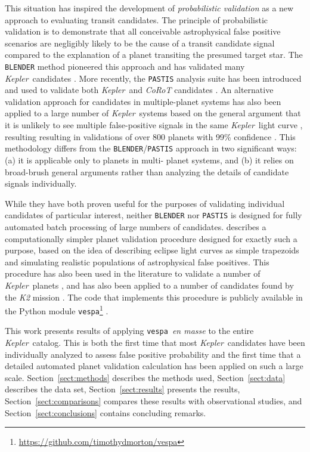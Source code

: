 \documentclass{emulateapj}
\newcommand{\sectionname}{Section}
\newcommand{\Sect}[1]{\sectionname~\ref{sect:#1}}
\newcommand{\sect}[1]{\Sect{#1}}
\newcommand{\kepler}{\textit{Kepler}}
\newcommand{\vespa}{\texttt{vespa}}
\begin{document}
This situation has inspired the development of \emph{probabilistic
validation} as a new approach to evaluating transit candidates.  The
principle of probabilistic validation is to demonstrate that all
conceivable astrophysical false positive scenarios are negligibly
likely to be the cause of a transit candidate signal compared to the
explanation of a planet transiting the presumed target star.  The
\verb|BLENDER| method pioneered this approach and has validated many
\kepler\ candidates
\citep[e.g.,][]{Borucki:2012,Kipping:2014,Torres:2015}.   More
recently, the \verb|PASTIS| analysis suite has been introduced
\citep{Diaz:2014} and used to validate both \kepler\ and
\textit{CoRoT} candidates \citep[e.g.,][]{Santerne:2014,Moutou:2014}.
An alternative validation approach for candidates in multiple-planet
systems has also been applied to a large number of \kepler\ systems
based on the general argument that it is unlikely to see multiple
false-positive signals in the same \kepler\ light curve
\citep{Lissauer:2012}, resulting resulting in validations of over 800
planets with 99\% confidence \citep{Lissauer:2014,Rowe:2014}. This
methodology differs from the \verb|BLENDER|/\verb|PASTIS| approach in
two significant ways: (a) it is applicable only to planets in multi-
planet systems, and (b) it relies on broad-brush general arguments
rather than analyzing the details of candidate signals individually.  


While they have both proven useful for the purposes of validating
individual candidates of particular interest, neither \verb|BLENDER|
nor \verb|PASTIS| is designed for fully automated batch processing of
large numbers of candidates.  \citet{Morton:2012} describes a
computationally simpler planet validation procedure designed for
exactly such a purpose, based on the idea of describing eclipse light
curves as simple trapezoids and simulating realistic populations of
astrophysical false positives. This procedure has also been used in
the literature to validate a number of \kepler\ planets
\citep[e.g.,][]{Muirhead:2012,Dawson:2012,Swift:2013}, and has also
been applied to a number of candidates found by the \textit{K2}
mission \citep{Montet:2015,Becker:2015}.  The code that implements
this procedure is publicly available in the Python module
\vespa\footnote{\url{https://github.com/timothydmorton/vespa}}
\citep{vespa}.

This work presents results of applying \vespa\ \emph{en masse} to the
entire \kepler\ catalog. This is both the first time that most
\kepler\ candidates have been individually analyzed to assess false
positive probability and the first time that a detailed automated
planet validation calculation has been applied on such a large scale.
\Sect{methods} describes the methods used, \sect{data} describes the data set,
\sect{results} presents the results, \sect{comparisons} compares these
results with observational studies, and \sect{conclusions} contains concluding
remarks.
\end{document}
